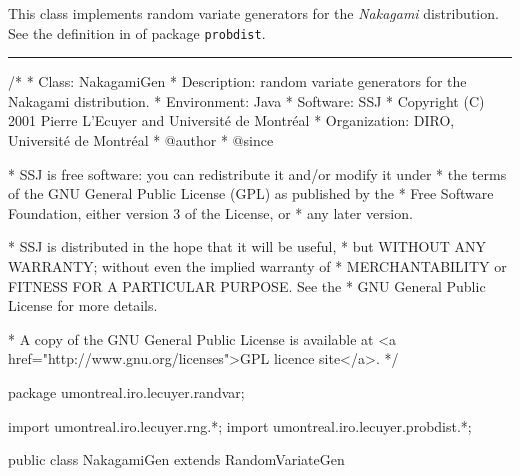 
This class implements random variate generators for the {\em Nakagami\/} 
distribution. See the definition in 
 of package
\texttt{probdist}.

\bigskip\hrule

\begin{code}
\begin{hide}
/*
 * Class:        NakagamiGen
 * Description:  random variate generators for the Nakagami distribution.
 * Environment:  Java
 * Software:     SSJ 
 * Copyright (C) 2001  Pierre L'Ecuyer and Université de Montréal
 * Organization: DIRO, Université de Montréal
 * @author       
 * @since

 * SSJ is free software: you can redistribute it and/or modify it under
 * the terms of the GNU General Public License (GPL) as published by the
 * Free Software Foundation, either version 3 of the License, or
 * any later version.

 * SSJ is distributed in the hope that it will be useful,
 * but WITHOUT ANY WARRANTY; without even the implied warranty of
 * MERCHANTABILITY or FITNESS FOR A PARTICULAR PURPOSE.  See the
 * GNU General Public License for more details.

 * A copy of the GNU General Public License is available at
   <a href="http://www.gnu.org/licenses">GPL licence site</a>.
 */
\end{hide}
package umontreal.iro.lecuyer.randvar;\begin{hide}
import umontreal.iro.lecuyer.rng.*;
import umontreal.iro.lecuyer.probdist.*;
\end{hide}

public class NakagamiGen extends RandomVariateGen \begin{hide} {
   // Distribution parameters
   protected double a;
   protected double lambda;
   protected double c;
\end{hide}
\end{code}

